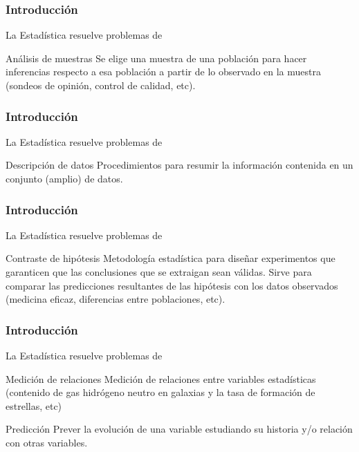 \documentclass[spanish]{beamer}
\begin{document}
\begin{frame}
\frametitle{Introducción}

La Estadística resuelve problemas de 
\begin{block}{Análisis de muestras}
Se elige una muestra de una población para hacer inferencias respecto a esa población a partir de lo observado en la muestra (sondeos de opinión, control de calidad, etc).
\end{block}

\end{frame}
\begin{frame}
\frametitle{Introducción}
La Estadística resuelve problemas de 
\begin{block}{Descripción de datos}
Procedimientos para resumir la información contenida en un conjunto (amplio) de datos.
\end{block}

\end{frame}
\begin{frame}
\frametitle{Introducción}

La Estadística resuelve problemas de 
\begin{block}{Contraste de hipótesis}
Metodología estadística para diseñar experimentos que garanticen que las conclusiones que se extraigan sean válidas. Sirve para comparar las predicciones resultantes de las hipótesis con los datos observados (medicina eficaz, diferencias entre poblaciones, etc).
\end{block}

\end{frame}
\begin{frame}
\frametitle{Introducción}

La Estadística resuelve problemas de 
\begin{block}{Medición de relaciones}
Medición de relaciones entre variables estadísticas (contenido de gas hidrógeno neutro en galaxias y la
tasa de formación de estrellas, etc)
\end{block}
\begin{block}{Predicción}
Prever la evolución de una variable estudiando su historia y/o relación con otras variables.
\end{block}


\end{frame}
\end{document}
